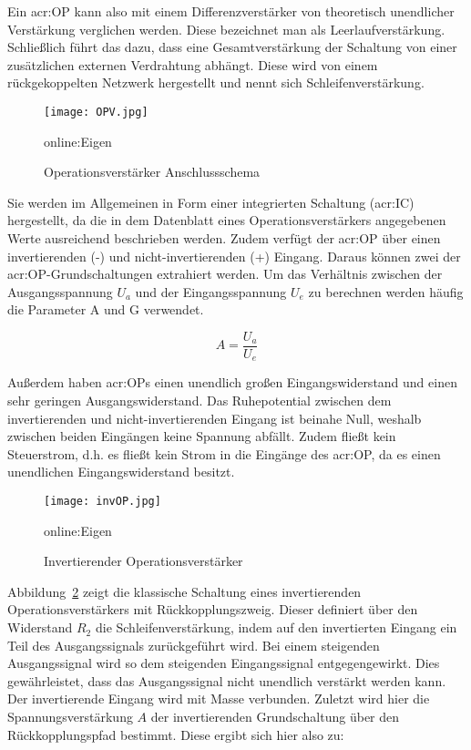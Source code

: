 Ein \gls{acr:OP} kann also mit einem Differenzverstärker von theoretisch unendlicher Verstärkung verglichen werden. Diese bezeichnet man als Leerlaufverstärkung. Schließlich führt das dazu, dass eine Gesamtverstärkung der Schaltung von einer zusätzlichen externen Verdrahtung abhängt. Diese wird von einem rückgekoppelten Netzwerk hergestellt und nennt sich Schleifenverstärkung.\cite{lutzHalbleiterLeistungsbauelemente2012}

\begin{figure}[H]
	\centering
	\texttt{[image: OPV.jpg]}
	\caption[Operationsverstärker Anschlussschema]{Operationsverstärker Anschlussschema} 
	\gls{online:Eigen}
	\label{fig:OPV}
\end{figure}

Sie werden im Allgemeinen in Form einer integrierten Schaltung (\gls{acr:IC}) hergestellt, da die in dem Datenblatt eines Operationsverstärkers angegebenen Werte ausreichend beschrieben werden. Zudem verfügt der \gls{acr:OP} über einen invertierenden (-) und nicht-invertierenden (+) Eingang.\cite{OP} Daraus können zwei der \gls{acr:OP}-Grundschaltungen extrahiert werden. Um das Verhältnis zwischen der Ausgangsspannung $U_{a}$ und der Eingangsspannung $U_{e}$ zu berechnen werden häufig die Parameter A und G verwendet.\cite{tietzeElectronicCircuits2008}

\begin{equation}
	\label{equ:bsp1}
	A = \frac{U_{a}}{U_{e}}
\end{equation}

Außerdem haben \gls{acr:OP}s einen unendlich großen Eingangswiderstand und einen sehr geringen Ausgangswiderstand.
Das Ruhepotential zwischen dem invertierenden und nicht-invertierenden Eingang ist beinahe Null, weshalb zwischen beiden Eingängen keine Spannung abfällt.\cite{tietzeElectronicCircuits2008} Zudem fließt kein Steuerstrom, d.h. es fließt kein Strom in die Eingänge des \gls{acr:OP}, da es einen unendlichen Eingangswiderstand besitzt.\cite{OP}

\begin{figure}[H]
	\centering
	\texttt{[image: invOP.jpg]}
	\caption[Invertierender Operationsverstärker]{Invertierender Operationsverstärker} 
	\gls{online:Eigen}
	\label{fig:ninvOP}
\end{figure}

Abbildung~\ref{fig:ninvOP} zeigt die klassische Schaltung eines invertierenden Operationsverstärkers mit
Rückkopplungszweig. Dieser definiert über den Widerstand $R_{2}$ die Schleifenverstärkung, indem auf den invertierten Eingang ein Teil des Ausgangssignals zurückgeführt wird.  Bei einem steigenden Ausgangssignal wird so dem steigenden Eingangssignal entgegengewirkt. Dies gewährleistet, dass das Ausgangssignal nicht unendlich verstärkt werden kann. Der invertierende Eingang wird mit Masse verbunden. Zuletzt wird hier die Spannungsverstärkung $A$ der invertierenden Grundschaltung über den Rückkopplungspfad bestimmt. Diese ergibt sich hier also zu: 

